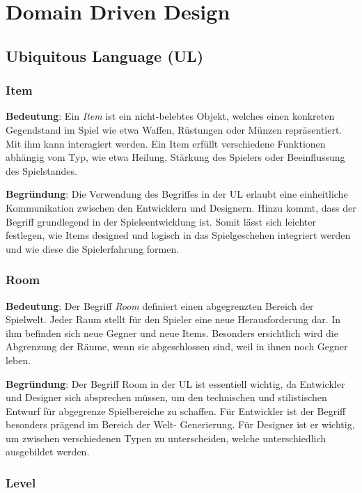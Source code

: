 \chapter{Domain Driven Design}

\section{Ubiquitous Language (UL)}
\subsection*{Item}

\textbf{Bedeutung}: Ein \textit{Item} ist ein nicht-belebtes Objekt,
welches einen konkreten Gegendstand im Spiel wie etwa Waffen,
Rüstungen oder Münzen repräsentiert. Mit ihm kann interagiert werden.
Ein Item erfüllt verschiedene Funktionen abhängig vom Typ, wie etwa
Heilung, Stärkung des Spielers oder Beeinflussung des Spielstandes.

\textbf{Begründung}: Die Verwendung des Begriffes in der UL erlaubt
eine einheitliche Kommunikation zwischen den Entwicklern und Designern.
Hinzu kommt, dass der Begriff grundlegend in der Spieleentwicklung ist.
Somit lässt sich leichter festlegen, wie Items designed und logisch
in das Spielgeschehen integriert werden und wie diese die Spielerfahrung
formen.



\subsection*{Room}

\textbf{Bedeutung}: Der Begriff \textit{Room} definiert einen
abgegrenzten Bereich der Spielwelt. Jeder Raum stellt für den Spieler
eine neue Herausforderung dar. In ihm befinden sich neue Gegner und
neue Items. Besonders ersichtlich wird die Abgrenzung der Räume, wenn
sie abgeschlossen sind, weil in ihnen noch Gegner leben.

\textbf{Begründung}: Der Begriff Room in der UL ist essentiell wichtig,
da Entwickler und Designer sich absprechen müssen, um den technischen
und stilistischen Entwurf für abgegrenze Spielbereiche zu schaffen.
Für Entwickler ist der Begriff besonders prägend im Bereich der Welt-
Generierung. Für Designer ist er wichtig, um zwischen verschiedenen
Typen zu unterscheiden, welche unterschiedlich ausgebildet werden.



\subsection*{Level}

